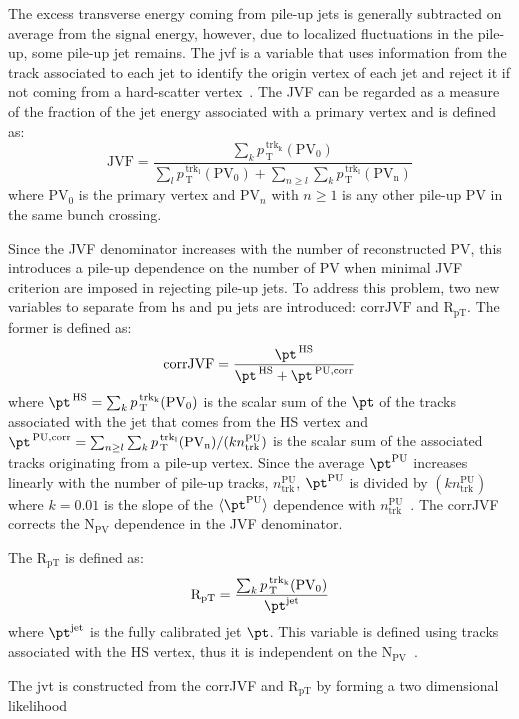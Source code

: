 The excess transverse energy coming from pile-up jets is generally subtracted on
average from the signal energy, however, due to localized fluctuations in the
pile-up, some pile-up jet remains. The \gls{jvf} is a variable that uses
information from the track associated to each jet to identify the origin vertex
of each jet and reject it if not coming from a hard-scatter
vertex~\cite{JVF}. The JVF can be regarded as a measure of the fraction of the
jet energy associated with a primary vertex and is defined as:
\begin{equation}
  \label{eq:77}
  \mathrm{JVF} = \frac{\sum_k p_\mathrm{\, T}^\mathrm{\, trk_k}
    (\mathrm{PV_0})}{\sum_l p_\mathrm{\, T}^\mathrm{\, trk_l} (\mathrm{PV_0}) +
    \sum_{n \geq l} \sum_k p_\mathrm{\, T}^\mathrm{\, trk_l} (\mathrm{PV_n})}
\end{equation}
where PV$_0$ is the primary vertex and PV$_n$ with $n \geq 1$ is any other
pile-up PV in the same bunch crossing.

Since the JVF denominator increases with the number of reconstructed PV, this
introduces a pile-up dependence on the number of PV when minimal JVF criterion
are imposed in rejecting pile-up jets. To address this problem, two new
variables to separate from \gls{hs} and \gls{pu} jets are introduced:
$\mathrm{corrJVF}$ and $\mathrm{R_{pT}}$. The former is defined as:
\begin{equation}
  \label{eq:78}
  \mathrm{corrJVF} = \frac{\pt^{\mathrm{\, HS}}}{\pt^{\, \mathrm{HS}} +
    \pt^{\, \mathrm{PU, corr}}}
\end{equation}
where
$\pt^{\mathrm{\, HS}} = \sum_k p_\mathrm{\, T}^\mathrm{\, trk_k}
(\mathrm{PV_0})$
is the scalar sum of the $\pt$ of the tracks associated with the jet that comes
from the HS vertex and
$\pt^{\, \mathrm{PU, corr}} = \sum_{n \geq l} \sum_k p_\mathrm{\, T}^\mathrm{\,
  trk_l} (\mathrm{PV_n}) / (k n_{\mathrm{trk}}^{\mathrm{PU}})$
is the scalar sum of the associated tracks originating from a pile-up
vertex. Since the average $\pt^{\mathrm{PU}}$ increases linearly with the number
of pile-up tracks, $n_{\mathrm{trk}}^{\mathrm{PU}}$, $\pt^{\mathrm{PU}}$ is
divided by $(kn_{\mathrm{trk}}^{\mathrm{PU}})$ where $k = 0.01$ is the slope of
the $\langle \pt^{\mathrm{PU}} \rangle$ dependence with
$n_{\mathrm{trk}}^{\mathrm{PU}}$~\cite{JVT}. The corrJVF corrects the
N$_\mathrm{PV}$ dependence in the JVF denominator.

The $\mathrm{R_{pT}}$ is defined as:
\begin{equation}
  \label{eq:79}
  \mathrm{R_{pT}} = \frac{\sum_k p_\mathrm{\, T}^\mathrm{\, trk_k}
    (\mathrm{PV_0})}{\pt^{\mathrm{jet}}}
\end{equation}
where $\pt^{\mathrm{jet}}$ is the fully calibrated jet $\pt$. This variable is
defined using tracks associated with the HS vertex, thus it is independent on
the N$_{\mathrm{PV}}$~\cite{PileUpPerformance}.

The \gls{jvt} is constructed from the corrJVF and $\mathrm{R_{pT}}$ by forming a
two dimensional likelihood

